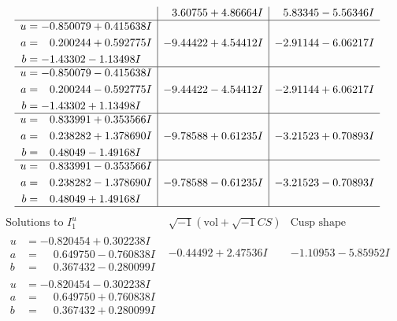 \documentclass[1p]{elsarticle_modified}
\theoremstyle{definition}
\newcommand{\I}{\sqrt{-1}}
\begin{document}
$$\begin{array}{c|c|c}
 & \phantom{-}3.60755 + 4.86664 I & \phantom{-}5.83345 - 5.56346 I \\ \hline\begin{aligned}
u &= -0.850079 + 0.415638 I \\
a &= \phantom{-}0.200244 + 0.592775 I \\
b &= -1.43302 - 1.13498 I\end{aligned}
 & -9.44422 + 4.54412 I & -2.91144 - 6.06217 I \\ \hline\begin{aligned}
u &= -0.850079 - 0.415638 I \\
a &= \phantom{-}0.200244 - 0.592775 I \\
b &= -1.43302 + 1.13498 I\end{aligned}
 & -9.44422 - 4.54412 I & -2.91144 + 6.06217 I \\ \hline\begin{aligned}
u &= \phantom{-}0.833991 + 0.353566 I \\
a &= \phantom{-}0.238282 + 1.378690 I \\
b &= \phantom{-}0.48049 - 1.49168 I\end{aligned}
 & -9.78588 + 0.61235 I & -3.21523 + 0.70893 I \\ \hline\begin{aligned}
u &= \phantom{-}0.833991 - 0.353566 I \\
a &= \phantom{-}0.238282 - 1.378690 I \\
b &= \phantom{-}0.48049 + 1.49168 I\end{aligned}
 & -9.78588 - 0.61235 I & -3.21523 - 0.70893 I\\
 \hline 
 \end{array}$$\newpage$$\begin{array}{c|c|c}  
\text{Solutions to }I^u_{1}& \I (\text{vol} + \sqrt{-1}CS) & \text{Cusp shape}\\
 \hline 
\begin{aligned}
u &= -0.820454 + 0.302238 I \\
a &= \phantom{-}0.649750 - 0.760838 I \\
b &= \phantom{-}0.367432 - 0.280099 I\end{aligned}
 & -0.44492 + 2.47536 I & -1.10953 - 5.85952 I \\ \hline\begin{aligned}
u &= -0.820454 - 0.302238 I \\
a &= \phantom{-}0.649750 + 0.760838 I \\
b &= \phantom{-}0.367432 + 0.280099 I\end{aligned}

\end{array}$$
\end{document}
